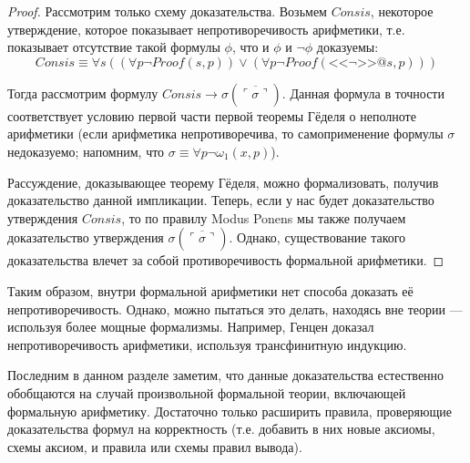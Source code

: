 \begin{proof}
Рассмотрим только схему доказательства. Возьмем $Consis$, некоторое 
утверждение, которое показывает непротиворечивость арифметики, т.е. 
показывает отсутствие такой формулы $\phi$, что и $\phi$ и $\neg \phi$ доказуемы:
$$Consis \equiv \forall s ((\forall p \neg Proof (s,p)) \vee (\forall p \neg Proof (\texttt{<<}\neg\texttt{>>} @ s, p)))$$

Тогда рассмотрим формулу $Consis \rightarrow \sigma (\overline{\ulcorner\sigma\urcorner})$.
Данная формула в точности соответствует условию первой части первой теоремы Гёделя 
о неполноте арифметики (если арифметика непротиворечива, то самоприменение формулы $\sigma$ недоказуемо;
напомним, что $\sigma \equiv \forall p \neg \omega_1 (x,p)$).

Рассуждение, доказывающее теорему Гёделя, можно формализовать, получив доказательство
данной импликации. Теперь, если у нас будет доказательство утверждения $Consis$,
то по правилу Modus Ponens мы также получаем доказательство утверждения $\sigma (\overline{\ulcorner\sigma\urcorner})$. 
Однако, существование такого доказательства влечет за собой противоречивость формальной арифметики.
\end{proof}

Таким образом, внутри формальной арифметики нет способа доказать её непротиворечивость.
Однако, можно пытаться это делать, находясь вне теории --- используя более 
мощные формализмы. Например, Генцен доказал непротиворечивость арифметики, 
используя трансфинитную индукцию.

Последним в данном разделе заметим, что данные доказательства естественно
обобщаются на случай произвольной формальной теории, включающей формальную
арифметику. Достаточно только расширить правила, проверяющие доказательства
формул на корректность (т.е. добавить в них новые аксиомы, схемы аксиом,
и правила или схемы правил вывода).
